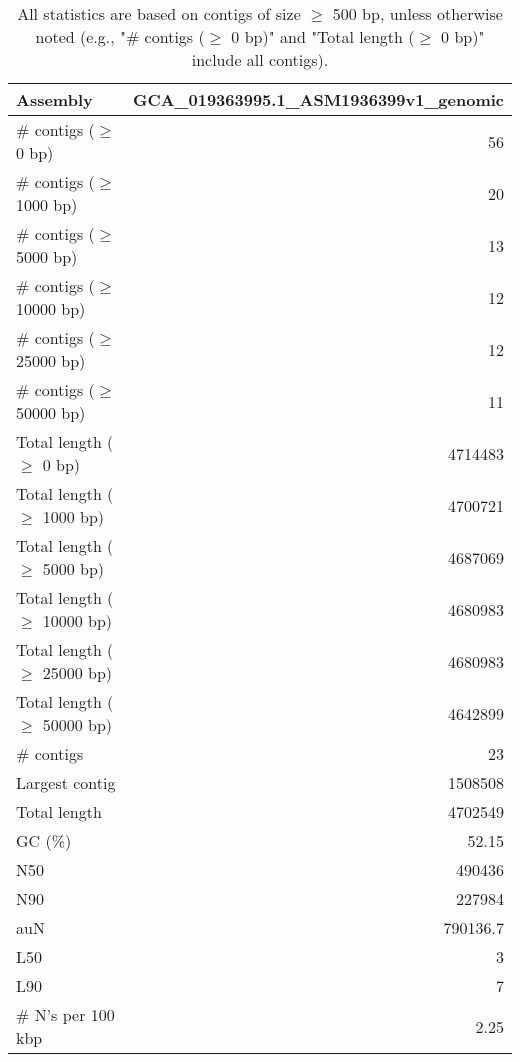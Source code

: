 \documentclass[12pt,a4paper]{article}
\begin{document}
\begin{table}[ht]
\begin{center}
\caption{All statistics are based on contigs of size $\geq$ 500 bp, unless otherwise noted (e.g., "\# contigs ($\geq$ 0 bp)" and "Total length ($\geq$ 0 bp)" include all contigs).}
\begin{tabular}{|l*{1}{|r}|}
\hline
Assembly & GCA\_019363995.1\_ASM1936399v1\_genomic \\ \hline
\# contigs ($\geq$ 0 bp) & 56 \\ \hline
\# contigs ($\geq$ 1000 bp) & 20 \\ \hline
\# contigs ($\geq$ 5000 bp) & 13 \\ \hline
\# contigs ($\geq$ 10000 bp) & 12 \\ \hline
\# contigs ($\geq$ 25000 bp) & 12 \\ \hline
\# contigs ($\geq$ 50000 bp) & 11 \\ \hline
Total length ($\geq$ 0 bp) & 4714483 \\ \hline
Total length ($\geq$ 1000 bp) & 4700721 \\ \hline
Total length ($\geq$ 5000 bp) & 4687069 \\ \hline
Total length ($\geq$ 10000 bp) & 4680983 \\ \hline
Total length ($\geq$ 25000 bp) & 4680983 \\ \hline
Total length ($\geq$ 50000 bp) & 4642899 \\ \hline
\# contigs & 23 \\ \hline
Largest contig & 1508508 \\ \hline
Total length & 4702549 \\ \hline
GC (\%) & 52.15 \\ \hline
N50 & 490436 \\ \hline
N90 & 227984 \\ \hline
auN & 790136.7 \\ \hline
L50 & 3 \\ \hline
L90 & 7 \\ \hline
\# N's per 100 kbp & 2.25 \\ \hline
\end{tabular}
\end{center}
\end{table}
\end{document}
